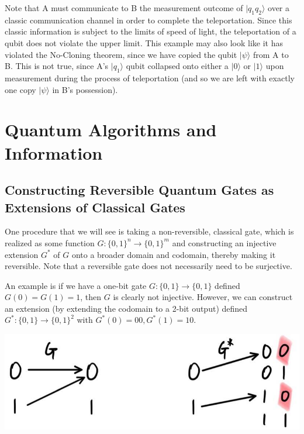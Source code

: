 \documentclass{article}
\theoremstyle{definition}
\begin{document}
    Note that A must communicate to B the measurement outcome of $|q_1 q_2 \rangle$ over a classic communication channel in order to complete the teleportation. Since this classic information is subject to the limits of speed of light, the teleportation of a qubit does not violate the upper limit. This example may also look like it has violated the No-Cloning theorem, since we have copied the qubit $|\psi\rangle$ from A to B. This is not true, since A's $|q_1\rangle$ qubit collapsed onto either a $|0\rangle$ or $|1\rangle$ upon measurement during the process of teleportation (and so we are left with exactly one copy $|\psi\rangle$ in B's possession).

\section{Quantum Algorithms and Information}

  \subsection{Constructing Reversible Quantum Gates as Extensions of Classical Gates}

    One procedure that we will see is taking a non-reversible, classical gate, which is realized as some function $G: \{0, 1\}^n \longrightarrow \{0, 1\}^m$ and constructing an injective extension $G^*$ of $G$ onto a broader domain and codomain, thereby making it reversible. Note that a reversible gate does not necessarily need to be surjective.

    An example is if we have a one-bit gate $G: \{0, 1\} \longrightarrow \{0, 1\}$ defined $G(0) = G(1) = 1$, then $G$ is clearly not injective. However, we can construct an extension (by extending the codomain to a 2-bit output) defined $G^*: \{0, 1\} \longrightarrow \{0, 1\}^2$ with $G^*(0) = 00, G^*(1) = 10$.

    \begin{center}
      \includegraphics[scale=0.3]{img/Extension_of_G.jpg}
    \end{center}
\end{document}
